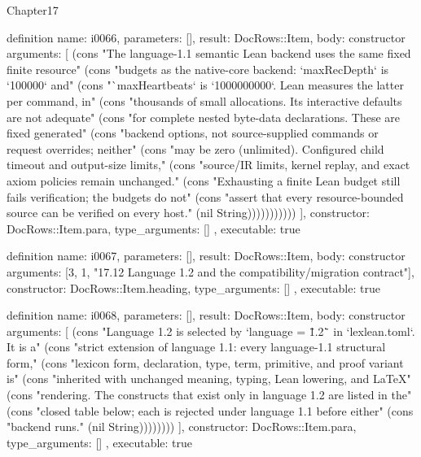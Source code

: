\begin{lexlean}{Chapter17}
\begin{semanticmodule}
definition{
  name: i0066,
  parameters: [],
  result: DocRows::Item,
  body: constructor{
    arguments: [
      (cons "The language-1.1 semantic Lean backend uses the same fixed finite resource" (cons "budgets as the native-core backend: `maxRecDepth` is `100000` and" (cons "`maxHeartbeats` is `1000000000`. Lean measures the latter per command, in" (cons "thousands of small allocations. Its interactive defaults are not adequate" (cons "for complete nested byte-data declarations. These are fixed generated" (cons "backend options, not source-supplied commands or request overrides; neither" (cons "may be zero (unlimited). Configured child timeout and output-size limits," (cons "source/IR limits, kernel replay, and exact axiom policies remain unchanged." (cons "Exhausting a finite Lean budget still fails verification; the budgets do not" (cons "assert that every resource-bounded source can be verified on every host." (nil String)))))))))))
    ],
    constructor: DocRows::Item.para,
    type_arguments: []
  },
  executable: true
}

definition{
  name: i0067,
  parameters: [],
  result: DocRows::Item,
  body: constructor{
    arguments: [3, 1, "17.12 Language 1.2 and the compatibility/migration contract"],
    constructor: DocRows::Item.heading,
    type_arguments: []
  },
  executable: true
}

definition{
  name: i0068,
  parameters: [],
  result: DocRows::Item,
  body: constructor{
    arguments: [
      (cons "Language 1.2 is selected by `language = \"1.2\"` in `lexlean.toml`. It is a" (cons "strict extension of language 1.1: every language-1.1 structural form," (cons "lexicon form, declaration, type, term, primitive, and proof variant is" (cons "inherited with unchanged meaning, typing, Lean lowering, and LaTeX" (cons "rendering. The constructs that exist only in language 1.2 are listed in the" (cons "closed table below; each is rejected under language 1.1 before either" (cons "backend runs." (nil String))))))))
    ],
    constructor: DocRows::Item.para,
    type_arguments: []
  },
  executable: true
}


\end{semanticmodule}
\end{lexlean}
